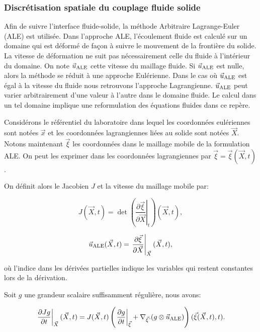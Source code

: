 \subsubsection[Discr\'etisation spatiale]{Discr\'etisation spatiale du couplage fluide solide}

Afin de suivre l'interface fluide-solide, la m\'ethode Arbitraire Lagrange-Euler (ALE) est utilis\'ee.
Dans l'approche ALE, l'\'ecoulement fluide est calcul\'e sur un domaine qui est d\'eform\'e de fa\c con \`a suivre le mouvement de la fronti\`ere du solide. La vitesse de d\'eformation  ne suit  pas n\'ecessairement celle du fluide \`a l'int\'erieur du domaine.
On note $\vale$ cette vitesse du maillage fluide. Si $\vale$ est nulle, alors la m\'ethode se r\'eduit \`a une approche Eul\'erienne. Dans le cas  o\`u $\vale$ est \'egal \`a la vitesse du fluide nous retrouvons l'approche Lagrangienne. $\vale$ peut varier arbitrairement d'une valeur \`a l'autre dans le domaine fluide. Le calcul dans un tel domaine implique une reformulation des \'equations fluides dans ce rep\`ere.

Consid\'erons le r\'ef\'erentiel du laboratoire dans lequel les coordonn\'ees eul\'eriennes sont not\'ees $\vec{x}$ et les coordonn\'ees lagrangiennes li\'ees au solide sont not\'ees $\vec{X}$. 
Notons maintenant $\vec{\xi} $ les coordonn\'ees dans le maillage mobile de la formulation ALE. On peut les exprimer dans les coordonn\'ees lagrangiennes par $\vec{\xi} = \vec{\xi} (\vec{X},t)$ .

On d\'efinit alors le Jacobien $J$ et la vitesse du maillage mobile par:

$$ J (\vec{X},t) = \det \left(  \left.\frac{\partial \vec{\xi}}{\partial \vec{X}}\right|_{t} \right) (\vec{X},t),  $$

$$ \vale(\vec{X},t) =  \left.\frac{\partial \vec{\xi}}{\partial \vec{X}}\right|_{\vec{X}}  (\vec{X},t),$$

o\`u l'indice dans les d\'eriv\'ees partielles indique les variables qui restent constantes lors de la d\'erivation.


Soit $g$ une grandeur scalaire suffisamment r\'eguli\`ere, nous avons:

\begin{equation}
\left.\frac{\partial J  g}{ \partial t} \right|_{\vec{X}}  (\vec{X},t) =  J(\vec{X},t) \left( \left.\frac{\partial g}{ \partial t}\right|_{\vec{\xi}} +  \nabla_{\vec{\xi}}.(g \otimes \vale) \right) (\vec{\xi} (\vec{X},t), t ).
\label{transformation}
\end{equation}


